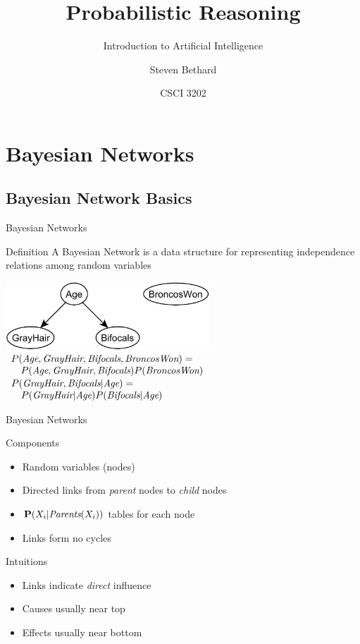 \documentclass[12pt]{beamer}
\title{Probabilistic Reasoning}
\subtitle{Introduction to Artificial Intelligence}
\author{Steven Bethard}
\institute{
  Department of Computer Science\\
  University of Colorado
}
\date{CSCI 3202}
\newcommand{\EM}[1]{\mbox{\em#1}}
\begin{document}
\begin{frame}
	\titlepage
\end{frame}

\section{Bayesian Networks}
\subsection{Bayesian Network Basics}
\begin{frame}{Bayesian Networks}
	\begin{block}{Definition}
		A \alert{Bayesian Network} is a data structure for representing independence relations among random variables
	\end{block}
	\pause
	\medskip
	\includegraphics[height=1in]{age_broncos_net} \\
	\medskip
	\pause
	$
	\begin{array}{ll}
	\lefteqn{P(\EM{Age}, \EM{GrayHair}, \EM{Bifocals}, \EM{BroncosWon}) = \mbox{}}\\ 
	& P(\EM{Age}, \EM{GrayHair}, \EM{Bifocals})P(\EM{BroncosWon})
	\end{array}
	$
	\pause
	\smallskip
	$
	\begin{array}{ll}
	\lefteqn{P(\EM{GrayHair},\EM{Bifocals}|\EM{Age}) = \mbox{}}\\ 
	& P(\EM{GrayHair}|\EM{Age})P(\EM{Bifocals}|\EM{Age})
	\end{array}
	$ \\
\end{frame}
\begin{frame}{Bayesian Networks}
	\begin{block}{Components}
		\begin{itemize}
			\item Random variables (nodes)
			\item Directed links from \EM{parent} nodes to \EM{child} nodes
			\item $\mathbf{P}(X_{i}|\EM{Parents}(X_{i}))$ tables for each node
			\item Links form no cycles
		\end{itemize}
	\end{block}
	\pause
	\begin{block}{Intuitions}
		\begin{itemize}
			\item Links indicate \emph{direct} influence
			\item Causes usually near top
			\item Effects usually near bottom
		\end{itemize}
	\end{block}
\end{frame}
\end{document}
